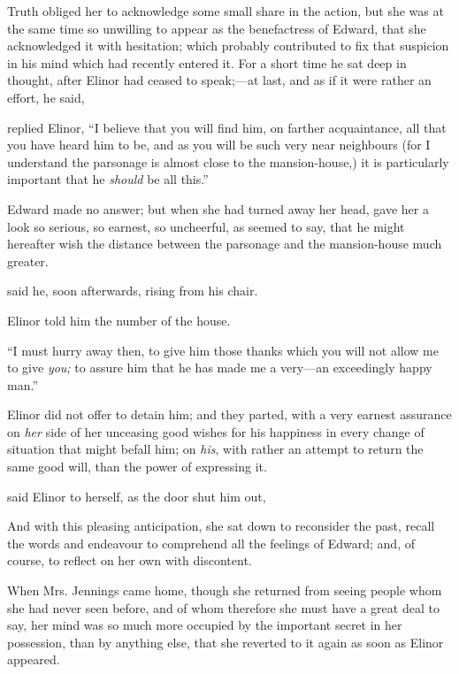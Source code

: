 Truth obliged her to acknowledge some small share in the action, but she was at the same time so unwilling to appear as the benefactress of Edward, that she acknowledged it with hesitation; which probably contributed to fix that suspicion in his mind which had recently entered it. For a short time he sat deep in thought, after Elinor had ceased to speak;---at last, and as if it were rather an effort, he said,


 replied Elinor, “I believe that you will find him, on farther acquaintance, all that you have heard him to be, and as you will be such very near neighbours (for I understand the parsonage is almost close to the mansion-house,) it is particularly important that he {\em should} be all this.”

Edward made no answer; but when she had turned away her head, gave her a look so serious, so earnest, so uncheerful, as seemed to say, that he might hereafter wish the distance between the parsonage and the mansion-house much greater.

 said he, soon afterwards, rising from his chair.

Elinor told him the number of the house.

“I must hurry away then, to give him those thanks which you will not allow me to give {\em you;} to assure him that he has made me a very---an exceedingly happy man.”

Elinor did not offer to detain him; and they parted, with a very earnest assurance on {\em her} side of her unceasing good wishes for his happiness in every change of situation that might befall him; on {\em his}, with rather an attempt to return the same good will, than the power of expressing it.

 said Elinor to herself, as the door shut him out, 

And with this pleasing anticipation, she sat down to reconsider the past, recall the words and endeavour to comprehend all the feelings of Edward; and, of course, to reflect on her own with discontent.

When Mrs. Jennings came home, though she returned from seeing people whom she had never seen before, and of whom therefore she must have a great deal to say, her mind was so much more occupied by the important secret in her possession, than by anything else, that she reverted to it again as soon as Elinor appeared.

